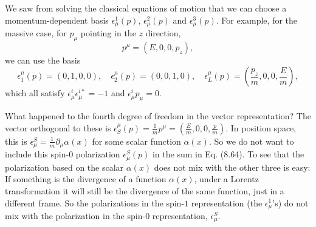 \documentclass[11pt]{article}
\theoremstyle{definition}
\begin{document}
We saw from solving the classical equations of motion that we can choose a momentum-dependent basis \(\epsilon^{1}_{\mu}(p)\), \(\epsilon^{2}_{\mu}(p)\) and \(\epsilon^{3}_{\mu}(p)\). For example, for the massive case, for \(p_{\mu}\) pointing in the \(z\) direction,
\begin{equation}
    p^{\mu}=(E,0,0,p_{z}), 
\end{equation}
we can use the basis
\begin{equation}
    \epsilon^{\mu}_{1}(p)=(0,1,0,0),\quad\epsilon^{\mu}_{2}(p)=(0,0,1,0),\quad\epsilon^{\mu}_{L}(p)=\left(\frac{p_{z}}{m},0,0,\frac{E}{m}\right),
\end{equation}
which all satisfy \(\epsilon^{i}_{\mu}\epsilon^{i*}_{\mu}=-1\) and \(\epsilon^{i}_{\mu}p_{\mu}=0\).

What happened to the fourth degree of freedom in the vector representation? The vector orthogonal to these is \(\epsilon^{\mu}_{S}(p)=\frac{1}{m}p^{\mu}=\left(\frac{E}{m},0,0,\frac{p}{m}\right)\). In position space, this is \(\epsilon^{S}_{\mu}=\frac{1}{m}\partial_{\mu}\alpha(x)\) for some scalar function \(\alpha(x)\). So we do not want to include this spin-\(0\) polarization \(\epsilon^{S}_{\mu}(p)\) in the sum in Eq. (8.64). To see that the polarization based on the scalar \(\alpha(x)\) does not mix with the other three is easy: If something is the divergence of a function \(\alpha(x)\), under a Lorentz transformation it will still be the divergence of the same function, just in a different frame. So the polarizations in the spin-\(1\) representation (the \(\epsilon^{1}_{\mu}\)'s) do not mix with the polarization in the spin-\(0\) representation, \(\epsilon^{S}_{\mu}\).
\end{document}

